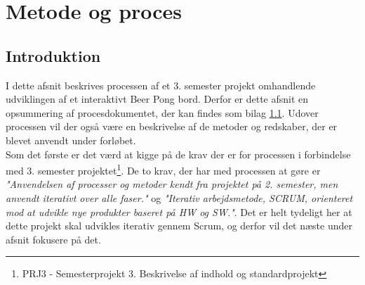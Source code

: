 \documentclass[Rapport/Rapport_main.tex]{subfiles}
\begin{document}
\section{Metode og proces}
\subsection{Introduktion}
I dette afsnit beskrives processen af et 3. semester projekt omhandlende udviklingen af et interaktivt Beer Pong bord. Derfor er dette afsnit en opsummering af procesdokumentet, der kan findes som bilag \ref{}. Udover processen vil der også være en beskrivelse af de metoder og redskaber, der er blevet anvendt under forløbet. \\
Som det første er det værd at kigge på de krav der er for processen i forbindelse med 3. semester projektet\footnote{PRJ3 - Semesterprojekt 3. Beskrivelse af indhold og standardprojekt}. De to krav, der har med processen at gøre er \textit{"Anvendelsen af processer og metoder kendt fra projektet på 2. semester, men anvendt iterativt over alle faser."} og \textit{"Iterativ arbejdsmetode, SCRUM, orienteret mod at udvikle nye produkter baseret på HW og SW."}. Det er helt tydeligt her at dette projekt skal udvikles iterativ gennem Scrum, og derfor vil det næste under afsnit fokusere på det.
\end{document}

